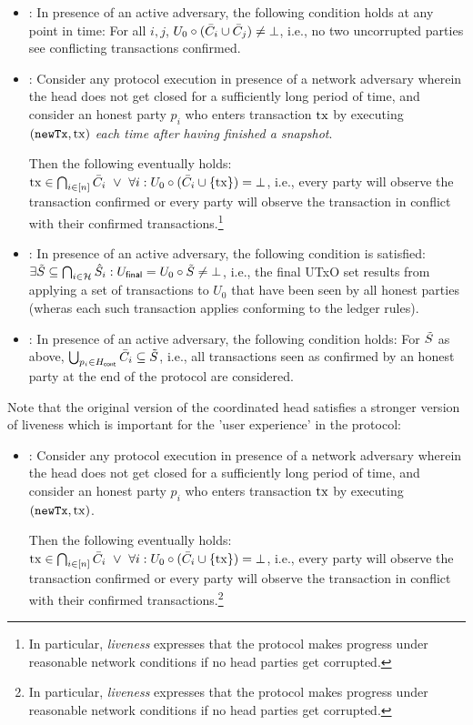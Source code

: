 \begin{itemize}
\item {}: In presence of an active adversary, the
  following condition holds at any point in time:
   For all $i,j$,
   $U_{0} \circ (\bar{C}_i \cup \bar{C}_j) \not= \bot$, i.e., no two
   uncorrupted parties see conflicting transactions confirmed.

  \item {}:
    Consider any protocol execution in presence of a network adversary wherein
    the head does not get closed for a sufficiently long period of time, and consider
    an honest party $p_i$ who enters transaction $\mathrm{tx}$ by executing $(\mathtt{newTx},\mathrm{tx})$ \emph{each time after having finished a snapshot}.

    Then the following eventually holds:
    $\tx \in \bigcap_{i\in[n]} \Tbar_i\ \vee\ %
    \forall i: \Uinit \circ (\Tbar_i\cup\{\tx\}) = \bot$,
    i.e., every party will observe the transaction confirmed or every party
    will observe the transaction in conflict with their confirmed transactions.\footnote{
      In particular, \emph{liveness} expresses that the protocol makes progress
      under reasonable network conditions if no head parties get corrupted.
    }

\item {}: In presence of an active adversary,
  the following condition is satisfied:
  $\exists \tilde{S} \subseteq \bigcap_{i \in \mathcal H} \hat{S}_i : U_{\mathsf{final}}
  = U_{0} \circ \tilde{S}\not=\bot$, i.e., the final UTxO set results
  from applying a set of transactions to $U_0$ that have been seen by
  all honest parties (wheras each such transaction applies conforming to the ledger rules).
\item {}: In presence of an active adversary,
  the following condition holds: For $\tilde{S}$ as above,
  $\bigcup_{p_i \in H_{\mathsf{cont}}} \bar{C}_i \subseteq \tilde{S}$, i.e., all
  transactions seen as confirmed by an honest party at the end of the
  protocol are considered.
\end{itemize}

Note that the original version of the coordinated head satisfies a stronger version of liveness which is important for the 'user experience' in the protocol:
\begin{itemize}
  \item {}:
    Consider any protocol execution in presence of a network adversary wherein
    the head does not get closed for a sufficiently long period of time, and consider
    an honest party $p_i$ who enters transaction $\mathrm{tx}$ by executing $(\mathtt{newTx},\mathrm{tx})$.

    Then the following eventually holds:
    $\tx \in \bigcap_{i\in[n]} \Tbar_i\ \vee\ %
    \forall i: \Uinit \circ (\Tbar_i\cup\{\tx\}) = \bot$,
    i.e., every party will observe the transaction confirmed or every party
    will observe the transaction in conflict with their confirmed transactions.\footnote{
      In particular, \emph{liveness} expresses that the protocol makes progress
      under reasonable network conditions if no head parties get corrupted.
    }
\end{itemize}


